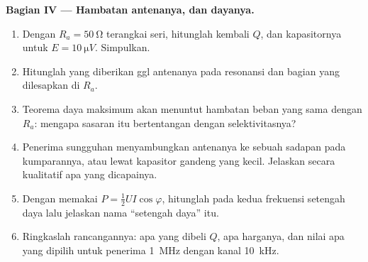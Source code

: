 \begin{problem}
\medskip
\noindent\textbf{Bagian IV --- Hambatan antenanya, dan dayanya.}
\begin{enumerate}[resume]
  \item Dengan $R_a = \qty{50}{\ohm}$ terangkai seri, hitunglah kembali
        $Q$,  dan  kapasitornya untuk
        $E = \qty{10}{\micro V}$. Simpulkan.
  \item Hitunglah  yang diberikan ggl antenanya pada
        resonansi dan bagian yang dilesapkan di $R_a$.
  \item Teorema daya maksimum akan menuntut hambatan beban yang sama
        dengan $R_a$: mengapa sasaran itu bertentangan dengan
        selektivitasnya?
  \item Penerima sungguhan menyambungkan antenanya ke sebuah sadapan
        pada kumparannya, atau lewat kapasitor gandeng yang kecil.
        Jelaskan secara kualitatif apa yang dicapainya.
  \item Dengan memakai $P = \tfrac12 UI\cos\varphi$, hitunglah  pada kedua frekuensi setengah daya lalu jelaskan nama
        ``setengah daya'' itu.
  \item Ringkaslah rancangannya: apa yang dibeli $Q$, apa harganya, dan
        nilai apa yang dipilih untuk penerima \qty{1}{MHz} dengan kanal
        \qty{10}{kHz}.
\end{enumerate}
\end{problem}
